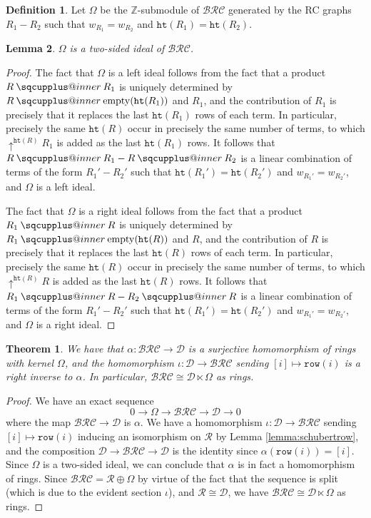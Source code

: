 \documentclass[a4paper,fleqn]{cas-sc}
\makeatletter
\newcommand{\sqcupplus@inner}[2]{%
  \vcenter{\hbox{\ooalign{%
    \hfil$\m@th#1\sqcup$\hfil\cr
    \hfil\raisebox{0.15ex}{$\m@th#1\scriptscriptstyle+$}\hfil\cr
  }}}%
}
\newcommand{\sqcupplus}{\mathbin{\mathpalette\sqcupplus@inner\relax}}
\newtheorem{lemma}{Lemma}[subsection]
\newtheorem{theorem}{Theorem}[section]
\theoremstyle{definition}
\newtheorem{definition}[lemma]{Definition}
\theoremstyle{remark}
\numberwithin{equation}{subsection}
\newcommand{\shup}{{\uparrow}}
\newcommand{\wof}[1]{w_{#1}}
\newcommand{\hr}{\mathtt{ht}}
\newcommand{\BRC}{\mathcal{BRC}}
\newcommand{\dcoma}{\mathcal{D}}
\makeatother
\begin{document}
\begin{definition}\label{definition:omega}
Let $\Omega$ be the $\mathbb{Z}$-submodule of $\BRC$ generated by the RC graphs $R_1-R_2$ such that $\wof{R_1}=\wof{R_2}$ and $\hr(R_1)=\hr(R_2)$.
\end{definition}

\begin{lemma}
$\Omega$ is a two-sided ideal of $\BRC$.
\end{lemma}
\begin{proof}
  The fact that $\Omega$ is a left ideal follows from the fact that a product $R\sqcupplus R_1$ is uniquely determined by $R\sqcupplus \mathrm{empty}(\hr(R_1))$ and $R_1$, and the contribution of $R_1$ is precisely that it replaces the last $\hr(R_1)$ rows of each term. In particular, precisely the same $\hr(R)$ occur in precisely the same number of terms, to which $\shup^{\hr(R)}R_1$ is added as the last $\hr(R_1)$ rows. It follows that $R\sqcupplus R_1 - R\sqcupplus R_2$ is a linear combination of terms of the form $R_1' - R_2'$ such that $\hr(R_1') = \hr(R_2')$ and $\wof{R_1'} = \wof{R_2'}$, and $\Omega$ is a left ideal.

  The fact that $\Omega$ is a right ideal follows from the fact that a product $R_1\sqcupplus R$ is uniquely determined by $R_1\sqcupplus \mathrm{empty}(\hr(R))$ and $R$, and the contribution of $R$ is precisely that it replaces the last $\hr(R)$ rows of each term. In particular, precisely the same $\hr(R)$ occur in precisely the same number of terms, to which $\shup^{\hr(R)}R$ is added as the last $\hr(R)$ rows. It follows that $R_1\sqcupplus R - R_2\sqcupplus R$ is a linear combination of terms of the form $R_1' - R_2'$ such that $\hr(R_1') = \hr(R_2')$ and $\wof{R_1'} = \wof{R_2'}$, and $\Omega$ is a right ideal.
\end{proof}

\begin{theorem} \label{theorem:semidirect}
  We have that $\alpha:\BRC\to \dcoma$ is a surjective homomorphism of rings with kernel $\Omega$, and the homomorphism $\iota:\dcoma\to\BRC$ sending $[i]\mapsto \mathtt{row}(i)$ is a right inverse to $\alpha$. In particular, $\BRC\cong \dcoma\ltimes \Omega$ as rings.
\end{theorem}
\begin{proof}
  We have an exact sequence
$$0\to \Omega\to \BRC\to \dcoma\to 0$$
where the map $\BRC\to \dcoma$ is $\alpha$. We have a homomorphism $\iota:\dcoma\to \BRC$ sending $[i]\mapsto \mathtt{row}(i)$ inducing an isomorphism on $\mathcal{R}$ by Lemma \ref{lemma:schubertrow}, and the composition $\dcoma\to \BRC\to \dcoma$ is the identity since $\alpha(\mathtt{row}(i)) = [i]$. Since $\Omega$ is a two-sided ideal, we can conclude that $\alpha$ is in fact a homomorphism of rings. Since $\BRC = \mathcal{R}\oplus \Omega$ by virtue of the fact that the sequence is split (which is due to the evident section $\iota$), and $\mathcal{R}\cong \dcoma$, we have $\BRC\cong \dcoma\ltimes \Omega$ as rings.
\end{proof}
\end{document}
